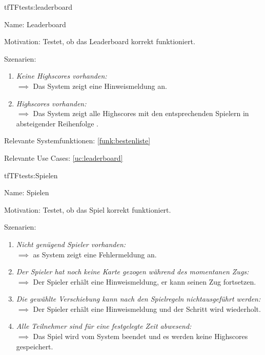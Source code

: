 \begin{description}[leftmargin=5em, style=sameline]
\begin{lhp}{tf}{TF}{tests:leaderboard}
	\item [Name:] Leaderboard
	\item [Motivation:] Testet, ob das Leaderboard korrekt funktioniert.
	\item [Szenarien:] \hfill
		\begin{enumerate}
		        \item \textit{Keine Highscores vorhanden:} \\ $\implies$ Das System zeigt eine Hinweismeldung an.
		        \item \textit{Highscores vorhanden:} \\ $\implies$ Das System zeigt alle Highscores mit den entsprechenden Spielern in absteigender Reihenfolge .
		\end{enumerate}
	\item [Relevante Systemfunktionen:] \ref{funk:bestenliste}
	\item [Relevante Use Cases:] \ref{uc:leaderboard}
\end{lhp}

\begin{lhp}{tf}{TF}{tests:Spielen}
	\item [Name:] Spielen
	\item [Motivation:] Testet, ob das Spiel korrekt funktioniert.
	\item [Szenarien:] \hfill
		\begin{enumerate}
		        \item \textit{Nicht genügend Spieler vorhanden:} \\ $\implies$ as System zeigt eine Fehlermeldung an.
				
				\item \textit{Der Spieler hat noch keine Karte gezogen während des momentanen Zugs:} \\ $\implies$  Der Spieler erhält eine Hinweismeldung, er kann seinen Zug fortsetzen.
				
				\item \textit{Die gewählte Verschiebung kann nach den Spielregeln nichtausgeführt werden:} \\ $\implies$ Der Spieler erhält eine Hinweismeldung und der Schritt wird wiederholt.
				
				\item \textit{Alle Teilnehmer sind für eine festgelegte Zeit abwesend:}\\ $\implies$ Das Spiel wird vom System beendet und es werden keine Highscores gespeichert.
				

\end{enumerate}
\end{lhp}
\end{description}
